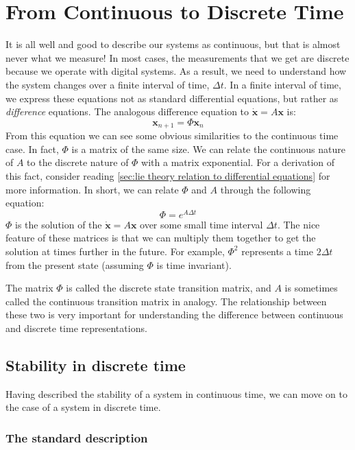 \section{From Continuous to Discrete Time}
It is all well and good to describe our systems as continuous, but that is almost never what we measure! In most cases, the measurements that we get are discrete because we operate with digital systems. As a result, we need to understand how the system changes over a finite interval of time, $\Delta t$. In a finite interval of time, we express these equations not as standard differential equations, but rather as \textit{difference} equations. The analogous difference equation to $\bm{\dot{x}}=A\bm{x}$ is:
$$\bm{x}_{n+1}=\Phi \bm{x}_n$$
From this equation we can see some obvious similarities to the continuous time case. In fact, $\Phi$ is a matrix of the same size. We can relate the continuous nature of $A$ to the discrete nature of $\Phi$ with a matrix exponential. For a derivation of this fact, consider reading \autoref{sec:lie theory relation to differential equations} for more information. In short, we can relate $\Phi$ and $A$ through the following equation:
$$\Phi=e^{A\Delta t}$$
$\Phi$ is the solution of the $\bm{\dot{x}}=A\bm{x}$ over some small time interval $\Delta t$. The nice feature of these matrices is that we can multiply them together to get the solution at times further in the future. For example, $\Phi^2$ represents a time $2\Delta t$ from the present state (assuming $\Phi$ is time invariant).

The matrix $\Phi$ is called the discrete state transition matrix, and $A$ is sometimes called the continuous transition matrix in analogy. The relationship between these two is very important for understanding the difference between continuous and discrete time representations.

\subsection{Stability in discrete time}
Having described the stability of a system in continuous time, we can move on to the case of a system in discrete time. 
\subsubsection{The standard description}

